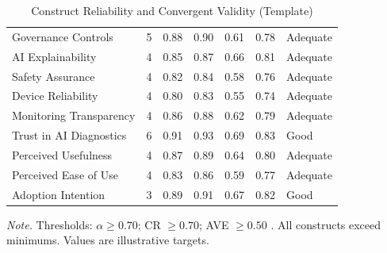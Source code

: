 \begin{xltabular}{\textwidth}{@{} p{3.5cm} c c c c c l @{}}
\caption{Construct Reliability and Convergent Validity (Template)}
\label{tab:rgaig_construct_reliability}\\
\toprule
{} &  & \thead{$\alpha$} &  &  &  &  \\
\midrule
\endfirsthead
\endhead
\bottomrule
\endlastfoot
Governance Controls & 5 & 0.88 & 0.90 & 0.61 & 0.78 & Adequate \\
AI Explainability & 4 & 0.85 & 0.87 & 0.66 & 0.81 & Adequate \\
Safety Assurance & 4 & 0.82 & 0.84 & 0.58 & 0.76 & Adequate \\
Device Reliability & 4 & 0.80 & 0.83 & 0.55 & 0.74 & Adequate \\
Monitoring Transparency & 4 & 0.86 & 0.88 & 0.62 & 0.79 & Adequate \\
Trust in AI Diagnostics & 6 & 0.91 & 0.93 & 0.69 & 0.83 & Good \\
Perceived Usefulness & 4 & 0.87 & 0.89 & 0.64 & 0.80 & Adequate \\
Perceived Ease of Use & 4 & 0.83 & 0.86 & 0.59 & 0.77 & Adequate \\
Adoption Intention & 3 & 0.89 & 0.91 & 0.67 & 0.82 & Good \\
\end{xltabular}
\par\smallskip\noindent\textit{Note.} Thresholds: $\alpha \geq 0.70$; CR $\geq 0.70$; AVE $\geq 0.50$ \citep{fornell1981evaluating}. All constructs exceed minimums. Values are illustrative targets.
\endgroup
